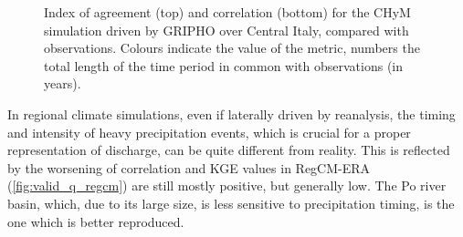 \begin{figure}
\begin{subfigure}{0.7\textwidth}
    \end{subfigure}
    \decoRule
    \caption[CHyM (GRIPHO) performance metrics for Central Italy]{
        Index of agreement (top) and correlation (bottom) for the CHyM simulation driven by GRIPHO over Central Italy, compared with observations. Colours indicate the value of the metric, numbers the total length of the time period in common with observations (in years).
    }\label{fig:valid_q_gripho_reg3}
\end{figure}

In regional climate simulations, even if laterally driven by reanalysis, the timing and intensity of heavy precipitation events, which is crucial for a proper representation of discharge, can be quite different from reality.
This is reflected by the worsening of 
correlation and KGE values in RegCM-ERA (\cref{fig:valid_q_regcm}) are still mostly positive, but generally low.
The Po river basin, which, due to its large size, is less sensitive to precipitation timing, is the one which is better reproduced.
